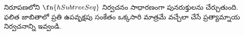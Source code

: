 \documentclass[../../../include/open-logic-section]{subfiles}
\begin{document}
\begin{prob}
   నిరూపణలోని
  $\fn{hSubtreeSeq}$ నిర్వచనం సాధారణంగా పునరుక్తులను చేర్చుతుంది.
  ఫలిత జాబితాలో ప్రతి ఉపవృక్షపు సంకేతం ఒక్కసారి మాత్రమే వచ్చేలా చేసే
  ప్రత్యామ్నాయ నిర్వచనాన్ని ఇవ్వండి.
\end{prob}
\end{document}
